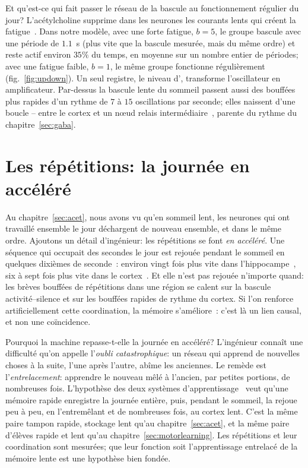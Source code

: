 Et qu'est-ce qui fait passer le réseau de la bascule au fonctionnement régulier du jour? L'acétylcholine supprime dans les neurones les courants lents qui créent la fatigue~\cite{McCormick1992}. Dans notre modèle, avec une forte fatigue, $b=5$, le groupe bascule avec une période de $1.1$~s (plus vite que la bascule mesurée, mais du même ordre) et reste actif environ $35\%$ du temps, en moyenne sur un nombre entier de périodes; avec une fatigue faible, $b=1$, le même groupe fonctionne régulièrement (fig.~\ref{fig:updown}). Un seul registre, le niveau d', transforme l'oscillateur en amplificateur. Par-dessus la bascule lente du sommeil passent aussi des bouffées plus rapides d'un rythme de $7$ à $15$ oscillations par seconde; elles naissent d'une boucle -- entre le cortex et un nœud relais intermédiaire~\cite{SteriadeMcCormickSejnowski1993}, parente du rythme du chapitre~\ref{sec:gaba}.

\section{Les répétitions: la journée en accéléré}

Au chapitre~\ref{sec:acet}, nous avons vu qu'en sommeil lent, les neurones qui ont travaillé ensemble le jour déchargent de nouveau ensemble, et dans le même ordre. Ajoutons un détail d'ingénieur: les répétitions se font \emph{en accéléré}. Une séquence qui occupait des secondes le jour est rejouée pendant le sommeil en quelques dixièmes de seconde~\cite{Nadasdy1999}: environ vingt fois plus vite dans l'hippocampe~\cite{LeeWilson2002}, six à sept fois plus vite dans le cortex~\cite{Euston2007}. Et elle n'est pas rejouée n'importe quand: les brèves bouffées de répétitions dans une région se calent sur la bascule activité--silence et sur les bouffées rapides de rythme du cortex. Si l'on renforce artificiellement cette coordination, la mémoire s'améliore~\cite{Maingret2016}: c'est là un lien causal, et non une coïncidence.

Pourquoi la machine repasse-t-elle la journée en accéléré? L'ingénieur connaît une difficulté qu'on appelle l'\emph{oubli catastrophique}: un réseau qui apprend de nouvelles choses à la suite, l'une après l'autre, abîme les anciennes. Le remède est l'\emph{entrelacement}: apprendre le nouveau mêlé à l'ancien, par petites portions, de nombreuses fois. L'hypothèse des deux systèmes d'apprentissage~\cite{McClelland1995} veut qu'une mémoire rapide enregistre la journée entière, puis, pendant le sommeil, la rejoue peu à peu, en l'entremêlant et de nombreuses fois, au cortex lent. C'est la même paire \og tampon rapide, stockage lent\fg{} qu'au chapitre~\ref{sec:acet}, et la même paire d'élèves rapide et lent qu'au chapitre~\ref{sec:motorlearning}. Les répétitions et leur coordination sont mesurées; que leur fonction soit l'apprentissage entrelacé de la mémoire lente est une hypothèse bien fondée.

